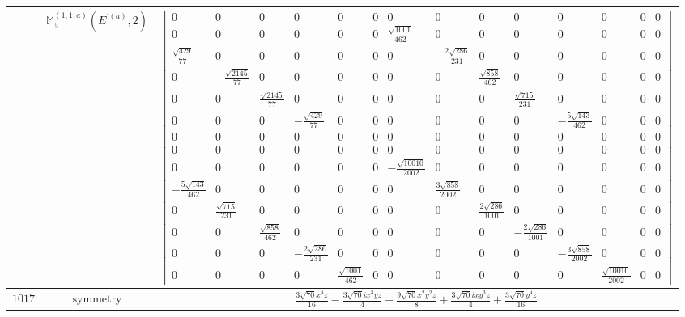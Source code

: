 \documentclass[fleqn,8pt,landscape]{jsarticle}
\begin{document}
\begin{longtable}{ccc}
$  $ & $ \mathbb{M}_{5}^{(1,1;a)}(E^{\prime(a)},2) $ & $ \begin{bmatrix} 0 & 0 & 0 & 0 & 0 & 0 & 0 & 0 & 0 & 0 & 0 & 0 & 0 & 0 \\ 0 & 0 & 0 & 0 & 0 & 0 & \frac{\sqrt{1001}}{462} & 0 & 0 & 0 & 0 & 0 & 0 & 0 \\ \frac{\sqrt{429}}{77} & 0 & 0 & 0 & 0 & 0 & 0 & - \frac{2 \sqrt{286}}{231} & 0 & 0 & 0 & 0 & 0 & 0 \\ 0 & - \frac{\sqrt{2145}}{77} & 0 & 0 & 0 & 0 & 0 & 0 & \frac{\sqrt{858}}{462} & 0 & 0 & 0 & 0 & 0 \\ 0 & 0 & \frac{\sqrt{2145}}{77} & 0 & 0 & 0 & 0 & 0 & 0 & \frac{\sqrt{715}}{231} & 0 & 0 & 0 & 0 \\ 0 & 0 & 0 & - \frac{\sqrt{429}}{77} & 0 & 0 & 0 & 0 & 0 & 0 & - \frac{5 \sqrt{143}}{462} & 0 & 0 & 0 \\ 0 & 0 & 0 & 0 & 0 & 0 & 0 & 0 & 0 & 0 & 0 & 0 & 0 & 0 \\ 0 & 0 & 0 & 0 & 0 & 0 & 0 & 0 & 0 & 0 & 0 & 0 & 0 & 0 \\ 0 & 0 & 0 & 0 & 0 & 0 & - \frac{\sqrt{10010}}{2002} & 0 & 0 & 0 & 0 & 0 & 0 & 0 \\ - \frac{5 \sqrt{143}}{462} & 0 & 0 & 0 & 0 & 0 & 0 & \frac{3 \sqrt{858}}{2002} & 0 & 0 & 0 & 0 & 0 & 0 \\ 0 & \frac{\sqrt{715}}{231} & 0 & 0 & 0 & 0 & 0 & 0 & \frac{2 \sqrt{286}}{1001} & 0 & 0 & 0 & 0 & 0 \\ 0 & 0 & \frac{\sqrt{858}}{462} & 0 & 0 & 0 & 0 & 0 & 0 & - \frac{2 \sqrt{286}}{1001} & 0 & 0 & 0 & 0 \\ 0 & 0 & 0 & - \frac{2 \sqrt{286}}{231} & 0 & 0 & 0 & 0 & 0 & 0 & - \frac{3 \sqrt{858}}{2002} & 0 & 0 & 0 \\ 0 & 0 & 0 & 0 & \frac{\sqrt{1001}}{462} & 0 & 0 & 0 & 0 & 0 & 0 & \frac{\sqrt{10010}}{2002} & 0 & 0 \end{bmatrix} $ \\ \hline
$ 1017 $ & $ \text{symmetry} $ & $ \frac{3 \sqrt{70} x^{4} z}{16} - \frac{3 \sqrt{70} i x^{3} y z}{4} - \frac{9 \sqrt{70} x^{2} y^{2} z}{8} + \frac{3 \sqrt{70} i x y^{3} z}{4} + \frac{3 \sqrt{70} y^{4} z}{16} $ \\

\end{longtable}
\end{document}
